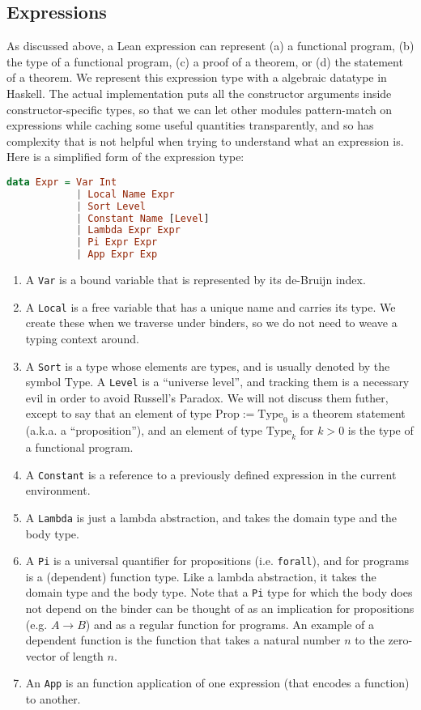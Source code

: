 \documentclass{article}
\begin{document}
\begin{spacing}{1.1}
\subsection{Expressions}
As discussed above, a Lean expression can represent (a) a functional program, (b) the type of a functional program, (c) a proof of a theorem, or (d) the statement of a theorem. We represent this expression type with a algebraic datatype in Haskell. The actual implementation puts all the constructor arguments inside constructor-specific types, so that we can let other modules pattern-match on expressions while caching some useful quantities transparently, and so has complexity that is not helpful when trying to understand what an expression is.  Here is a simplified form of the expression type:
\begin{lstlisting}[language=Haskell]
  data Expr = Var Int
            | Local Name Expr
            | Sort Level
            | Constant Name [Level]
            | Lambda Expr Expr
            | Pi Expr Expr
            | App Expr Exp
\end{lstlisting}
\begin{enumerate}
  \item A \lstinline{Var} is a bound variable that is represented by its de-Bruijn index.
  \item A \lstinline{Local} is a free variable that has a unique name and carries its type. We create these when we traverse under binders, so we do not need to weave a typing context around.
  \item A \lstinline{Sort} is a type whose elements are types, and is usually denoted by the symbol \( \mathrm{Type} \). A \lstinline{Level} is a ``universe level'', and tracking them is a necessary evil in order to avoid Russell's Paradox. We will not discuss them futher, except to say that an element of type \( \mathrm{Prop} := \mathrm{Type}_0 \) is a theorem statement (a.k.a. a ``proposition''), and an element of type \( \mathrm{Type}_k \) for \( k > 0 \) is the type of a functional program.
  \item A \lstinline{Constant} is a reference to a previously defined expression in the current environment.
  \item A \lstinline{Lambda} is just a lambda abstraction, and takes the domain type and the body type.
  \item A \lstinline{Pi} is a universal quantifier for propositions (i.e. \lstinline{forall}), and for programs is a (dependent) function type. Like a lambda abstraction, it takes the domain type and the body type. Note that a \lstinline{Pi} type for which the body does not depend on the binder can be thought of as an implication for propositions (e.g. \( A \to B \)) and as a regular function for programs. An example of a dependent function is the function that takes a natural number \( n \) to the zero-vector of length \( n \).
  \item An \lstinline{App} is an function application of one expression (that encodes a function) to another.
\end{enumerate}


\end{spacing}
\end{document}
